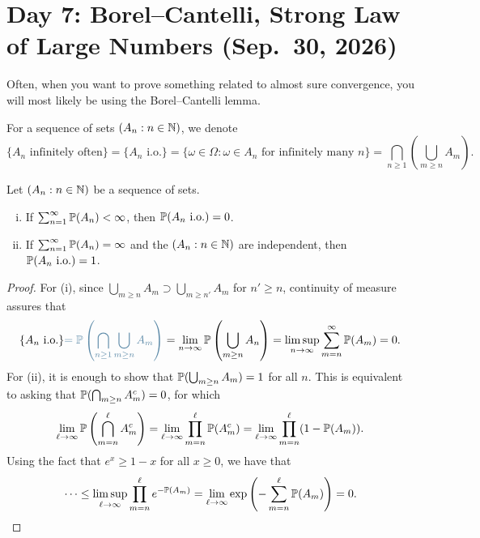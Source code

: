 \section{Day 7: Borel--Cantelli, Strong Law of Large Numbers (Sep.\ 30, 2026)}
Often, when you want to prove something related to almost sure convergence, you will most likely be using the Borel--Cantelli lemma.

For a sequence of sets $(A_n : n \in \mathbb N)$, we denote
\[ \{A_n \text{ infinitely often}\} = \{A_n \text{ i.o.}\} = \{\omega \in \Omega \colon \omega \in A_n \text{ for infinitely many $n$}\} = \bigcap_{n \geq 1} \left(\bigcup_{m \geq n} A_m\right). \]

\begin{lemma} \label{lem:borel_cantelli}
    Let $(A_n : n \in \mathbb N)$ be a sequence of sets.
    \begin{enumerate}[(i)]
        \item If $\sum_{n=1}^\infty \mathbb P(A_n) < \infty$, then $\mathbb P(A_n \text{ i.o.}) = 0$.
        \item If $\sum_{n=1}^\infty \mathbb P(A_n) = \infty$ and the $(A_n : n \in \mathbb N)$ are independent, then $\mathbb P(A_n \text{ i.o.}) = 1$.
    \end{enumerate} 
\end{lemma}
\begin{proof}
    For (i), {\color{airforceblue} since $\bigcup_{m \geq n} A_m \supset \bigcup_{m \geq n'} A_m$ for $n' \geq n$}, continuity of measure assures that
    \[ \{A_n \text{ i.o.}\} {\color{airforceblue}= \PP \left(\bigcap_{n \geq 1} \bigcup_{m \geq n} A_m\right)} = \lim_{n \to \infty} \PP \left(\bigcup_{m \geq n} A_n\right) = \limsup_{n \to \infty} \sum_{m = n}^\infty \PP(A_m) = 0. \]
    For (ii), it is enough to show that $\mathbb P(\bigcup_{m \geq n} A_m) = 1$ for all $n$. This is equivalent to asking that $\mathbb P(\bigcap_{m \geq n} A_m^c) = 0$, for which
    \[ \lim_{\ell \to \infty} \mathbb P\left(\bigcap_{m = n}^\ell A_m^c\right) = \lim_{\ell \to \infty} \prod_{m=n}^\ell \mathbb P(A_m^c) = \lim_{\ell \to \infty} \prod_{m=n}^\ell (1 - \mathbb P(A_m)). \]
    Using the fact that $e^x \geq 1 - x$ for all $x \geq 0$, we have that
    \[ \dots \leq \limsup_{\ell \to \infty} \prod_{m = n}^\ell e^{-\mathbb P(A_m)} = \lim_{\ell \to \infty} \exp \left(-\sum_{m=n}^\ell \mathbb P(A_m)\right) = 0. \qedhere \]
\end{proof}

